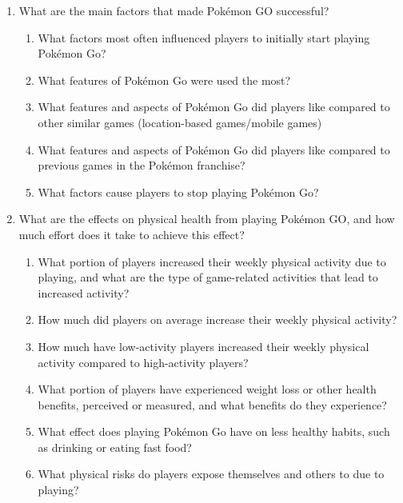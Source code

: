 \begin{enumerate}
	\item What are the main factors that made Pokémon GO successful?
	\begin{enumerate}[label*=\arabic*.]
		\item What factors most often influenced players to initially start playing Pokémon Go?
		\item What features of Pokémon Go were used the most?
		\item What features and aspects of Pokémon Go did players like compared to other similar games (location-based games/mobile games)
		\item What features and aspects of Pokémon Go did players like compared to previous games in the Pokémon franchise?
		\item What factors cause players to stop playing Pokémon Go?
	\end{enumerate}
	\item What are the effects on physical health from playing Pokémon GO, and how much effort does it take to achieve this effect?
	\begin{enumerate}[label*=\arabic*.]
		\item What portion of players increased their weekly physical activity due to playing, and what are the type of game-related activities that lead to increased activity?
		\item How much did players on average increase their weekly physical activity?
		\item How much have low-activity players increased their weekly physical activity compared to high-activity players?
		\item What portion of players have experienced weight loss or other health benefits, perceived or measured, and what benefits do they experience?
		\item What effect does playing Pokémon Go have on less healthy habits, such as drinking or eating fast food?
		\item What physical risks do players expose themselves and others to due to playing?
	\end{enumerate}
\end{enumerate}